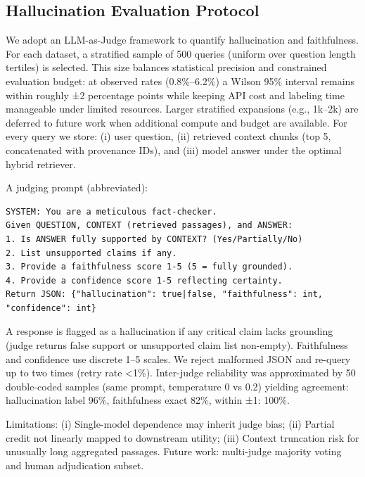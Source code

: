 \documentclass[conference]{IEEEtran}
\begin{document}
\subsection{Hallucination Evaluation Protocol}
We adopt an LLM-as-Judge framework to quantify hallucination and faithfulness. For each dataset, a stratified sample of 500 queries (uniform over question length tertiles) is selected. This size balances statistical precision and constrained evaluation budget: at observed rates (0.8\%--6.2\%) a Wilson 95\% interval remains within roughly ±2 percentage points while keeping API cost and labeling time manageable under limited resources. Larger stratified expansions (e.g., 1k--2k) are deferred to future work when additional compute and budget are available. For every query we store: (i) user question, (ii) retrieved context chunks (top 5, concatenated with provenance IDs), and (iii) model answer under the optimal hybrid retriever.

A judging prompt (abbreviated):
\begin{lstlisting}[basicstyle=\ttfamily\scriptsize]
SYSTEM: You are a meticulous fact-checker.
Given QUESTION, CONTEXT (retrieved passages), and ANSWER:
1. Is ANSWER fully supported by CONTEXT? (Yes/Partially/No)
2. List unsupported claims if any.
3. Provide a faithfulness score 1-5 (5 = fully grounded).
4. Provide a confidence score 1-5 reflecting certainty.
Return JSON: {"hallucination": true|false, "faithfulness": int, "confidence": int}
\end{lstlisting}

A response is flagged as a hallucination if any critical claim lacks grounding (judge returns false support or unsupported claim list non-empty). Faithfulness and confidence use discrete 1--5 scales. We reject malformed JSON and re-query up to two times (retry rate <1\%). Inter-judge reliability was approximated by 50 double-coded samples (same prompt, temperature 0 vs 0.2) yielding agreement: hallucination label 96\%, faithfulness exact 82\%, within ±1: 100\%.

Limitations: (i) Single-model dependence may inherit judge bias; (ii) Partial credit not linearly mapped to downstream utility; (iii) Context truncation risk for unusually long aggregated passages. Future work: multi-judge majority voting and human adjudication subset.
\end{document}
